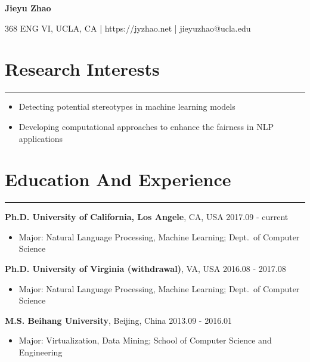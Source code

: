 \documentclass[11pt, a4paper]{article}
\newcommand{\hr}{\hrule\vspace{0.5em}}
\begin{document}
	

\begin{center}
	{\large \bf Jieyu Zhao}
\end{center}
\begin{center}
	{368 ENG VI, UCLA, CA | {https://jyzhao.net} | {jieyuzhao@ucla.edu}}
\end{center}

\section*{Research Interests}
\hr
\begin{itemize}
\item Detecting potential stereotypes in machine learning models
\item Developing computational approaches to enhance the fairness in NLP applications
\end{itemize}


\section*{Education And Experience}
\hr
\textbf{Ph.D. University of California, Los Angele}, CA, USA \hfill {2017.09 - current}
	\begin{itemize}
	\item Major: Natural Language Processing, Machine Learning; Dept.~of Computer Science
	\end{itemize}

\textbf{Ph.D. University of Virginia (withdrawal)}, VA, USA \hfill 2016.08 - 2017.08
	\begin{itemize}
	\item Major: Natural Language Processing, Machine Learning; Dept.~of Computer Science
	\end{itemize}

\textbf{M.S. Beihang University}, Beijing, China \hfill 2013.09 - 2016.01
	\begin{itemize}
	\item Major: Virtualization, Data Mining; School of Computer Science and Engineering
	\end{itemize}
\end{document}

